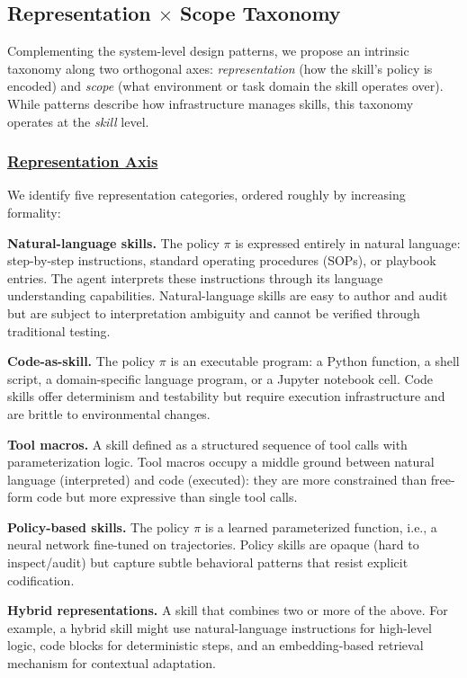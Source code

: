 \documentclass[conference, compsoc]{IEEEtran}
\theoremstyle{plain}
\newcommand{\para}[1]{\smallskip\noindent\textbf{#1.}}
\begin{document}
\subsection{Representation $\times$ Scope Taxonomy}
\label{sec:taxonomy}

Complementing the system-level design patterns, we propose an intrinsic taxonomy along two orthogonal axes: \emph{representation} (how the skill's policy is encoded) and \emph{scope} (what environment or task domain the skill operates over). While patterns describe how infrastructure manages skills, this taxonomy operates at the \emph{skill} level.

\subsubsection{\underline{Representation Axis}}
\label{sec:taxonomy:repr}

We identify five representation categories, ordered roughly by increasing formality:

\para{Natural-language skills} The policy $\pi$ is expressed entirely in natural language: step-by-step instructions, standard operating procedures (SOPs), or playbook entries. The agent interprets these instructions through its language understanding capabilities. Natural-language skills are easy to author and audit but are subject to interpretation ambiguity and cannot be verified through traditional testing.

\para{Code-as-skill} The policy $\pi$ is an executable program: a Python function, a shell script, a domain-specific language program, or a Jupyter notebook cell. Code skills offer determinism and testability but require execution infrastructure and are brittle to environmental changes.

\para{Tool macros} A skill defined as a structured sequence of tool calls with parameterization logic. Tool macros occupy a middle ground between natural language (interpreted) and code (executed): they are more constrained than free-form code but more expressive than single tool calls.

\para{Policy-based skills} The policy $\pi$ is a learned parameterized function, i.e., a neural network fine-tuned on trajectories. Policy skills are opaque (hard to inspect/audit) but capture subtle behavioral patterns that resist explicit codification.

\para{Hybrid representations} A skill that combines two or more of the above. For example, a hybrid skill might use natural-language instructions for high-level logic, code blocks for deterministic steps, and an embedding-based retrieval mechanism for contextual adaptation.
\end{document}
